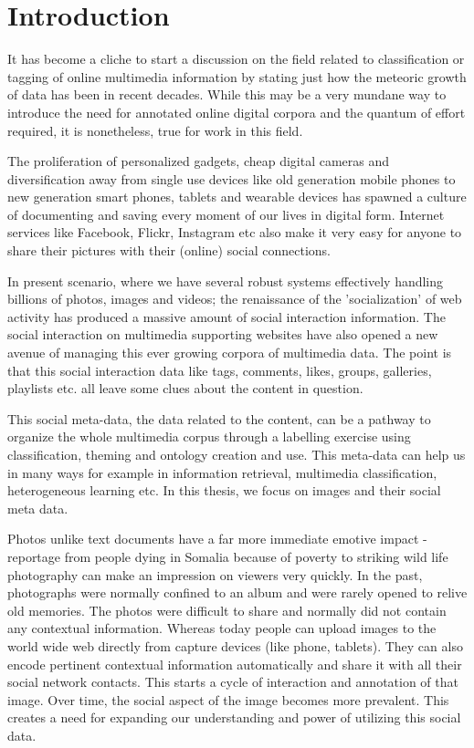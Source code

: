 \chapter{Introduction} %
\label{INTR} %
It has become a cliche to start a discussion on the field related to 
classification or tagging of online multimedia information by 
stating just how the meteoric growth of data has been in recent 
decades. While this may be a very mundane way to introduce the need 
for annotated online digital corpora and the quantum of effort 
required, it is nonetheless, true for work in this field.

The proliferation of personalized gadgets, cheap digital cameras and 
diversification away from single use devices like old generation mobile 
phones to new generation smart phones, tablets and wearable devices has
spawned a culture of documenting and saving every moment of our lives in 
digital form. Internet services like Facebook, Flickr, 
Instagram etc also make it very easy for anyone to share 
their pictures with their (online) social connections.

In present scenario, where we have several robust systems 
effectively handling billions of photos, images and videos; the 
renaissance of the 'socialization' of web activity has produced a 
massive amount of social interaction information. The social 
interaction on multimedia supporting websites have also opened a new 
avenue of managing this ever growing corpora of multimedia data. The 
point is that this social interaction data like tags, comments, likes, 
groups, galleries, playlists etc. all leave some clues about the 
content in question.

This social meta-data, the data related to the content, can be a 
pathway to organize the whole multimedia corpus through a labelling
exercise using classification, theming and ontology creation and use. 
This meta-data can help us in many ways for example in 
information retrieval, multimedia classification, heterogeneous 
learning etc. In this thesis, we focus on images and their social meta data.

Photos unlike text documents have a far more immediate 
emotive impact - reportage from people dying in Somalia because of 
poverty to striking wild life photography can make an impression on 
viewers very quickly. In the past, photographs were normally confined to 
an album and were rarely opened to relive old memories. The 
photos were difficult to share and normally did not contain any 
contextual information. Whereas today people can 
upload images to the world wide web directly from capture devices 
(like phone, tablets). They can also encode pertinent contextual 
information automatically and share it with all their social network 
contacts. This starts a cycle of interaction and annotation of that 
image. Over time, the social aspect of the image becomes more 
prevalent. This creates a need for expanding our understanding and 
power of utilizing this social data.

